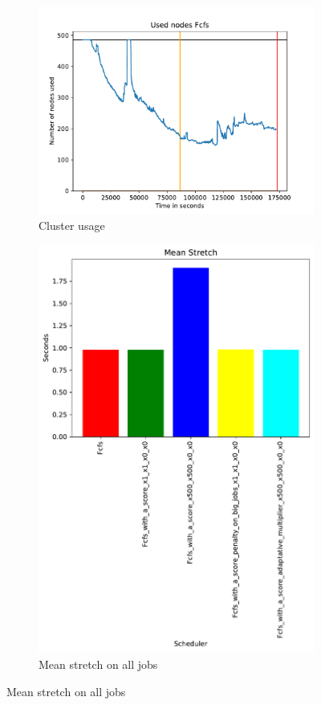 \documentclass[a4paper]{article}
\begin{document}
\begin{figure}[H]\centering
\begin{subfigure}[b]{0.4\linewidth}\centering\includegraphics[width=0.9\linewidth]{MBSS/plot/2022-01-21->2022-01-21_V9271_sparse_50_Fcfs_Used_nodes_450_128_32_256_4_1024.pdf}\caption{Cluster usage}\label{45}\end{subfigure}
\begin{subfigure}[b]{0.4\linewidth}\centering\includegraphics[width=0.9\linewidth]{MBSS/plot/Results_FCFS_Score_Adaptative_Multiplier_2022-01-21->2022-01-21_V9271_sparse_50_Mean_Stretch_450_128_32_256_4_1024.pdf}\caption{Mean stretch on all jobs}\label{45}\end{subfigure}

\end{figure}
\end{document}
